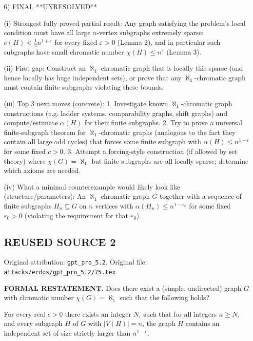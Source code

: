 6) FINAL
**UNRESOLVED**

(i) Strongest fully proved partial result:
Any graph satisfying the problem's local condition must have all large $n$-vertex subgraphs extremely sparse: $e(H)<\tfrac12 n^{1+\varepsilon}$ for every fixed $\varepsilon>0$ (Lemma 2),
and in particular such subgraphs have small chromatic number $\chi(H)\le n^{\varepsilon}$ (Lemma 3).

(ii) First gap:
Construct an $\aleph_1$-chromatic graph that is locally this sparse (and hence locally has huge independent sets), or prove that any $\aleph_1$-chromatic graph must contain finite subgraphs violating these bounds.

(iii) Top 3 next moves (concrete):
1. Investigate known $\aleph_1$-chromatic graph constructions (e.g. ladder systems, comparability graphs, shift graphs) and compute/estimate $\alpha(H)$ for their finite subgraphs.
2. Try to prove a universal finite-subgraph theorem for $\aleph_1$-chromatic graphs (analogous to the fact they contain all large odd cycles) that forces some finite subgraph with $\alpha(H)\le n^{1-c}$ for some fixed $c>0$.
3. Attempt a forcing-style construction (if allowed by set theory) where $\chi(G)=\aleph_1$ but finite subgraphs are all locally sparse; determine which axioms are needed.

(iv) What a minimal counterexample would likely look like (structure/parameters):
An $\aleph_1$-chromatic graph $G$ together with a sequence of finite subgraphs $H_n\subseteq G$ on $n$ vertices
with $\alpha(H_n)\le n^{1-\varepsilon_0}$ for some fixed $\varepsilon_0>0$ (violating the requirement for that $\varepsilon_0$).



\subsection*{REUSED SOURCE 2}
Original attribution: \texttt{gpt\_pro\_5.2}.
Original file: \texttt{attacks/erdos/gpt\_pro\_5.2/75.tex}.


\noindent\textbf{FORMAL RESTATEMENT.}
Does there exist a (simple, undirected) graph $G$ with chromatic number $\chi(G)=\aleph_1$ such that the following holds?

For every real $\epsilon>0$ there exists an integer $N_\epsilon$ such that for all integers $n\ge N_\epsilon$ and every subgraph $H$ of $G$ with $\lvert V(H)\rvert=n$, the graph $H$ contains an independent set of size strictly larger than $n^{1-\epsilon}$.

